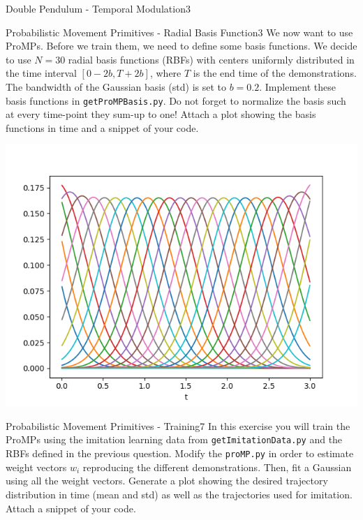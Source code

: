 \begin{questions}
\begin{question}{Double Pendulum - Temporal Modulation}{3}
\end{question}


\begin{question}[bonus]{Probabilistic Movement Primitives - Radial Basis Function}{3}
We now want to use ProMPs. Before we train them, we need to define some basis functions. We decide to use $N = 30$ radial basis functions (RBFs) with centers uniformly distributed in the time interval $[0-2b,T+2b]$, where $T$ is the end time of the demonstrations.
The bandwidth of the Gaussian basis (std) is set to $b=0.2$. 
Implement these basis functions in \texttt{getProMPBasis.py}. 
Do not forget to normalize the basis such at every time-point they sum-up to one! Attach a plot showing the basis functions in time and a snippet of your code. 

\begin{answer}

\begin{center}
	\includegraphics[width=0.6\linewidth]{img/2f.png}
	\label{fig:gaussian_basis}
\end{center}


\end{answer}
\end{question}


\begin{question}[bonus]{Probabilistic Movement Primitives - Training}{7}
In this exercise you will train the ProMPs using the imitation learning data from \texttt{getImitationData.py} and the RBFs defined in the previous question. Modify the \texttt{proMP.py} in order to estimate weight vectors $w_i$ reproducing the different demonstrations. Then, fit a Gaussian using all the weight vectors. Generate a plot showing the desired trajectory distribution in time (mean and std) as well as the trajectories used for imitation. Attach a snippet of your code.  


\end{question}
\end{questions}
